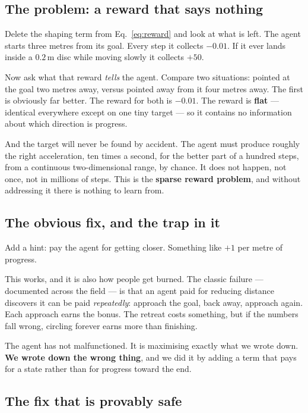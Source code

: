 \documentclass[11pt,a4paper]{article}
\begin{document}
\subsection{The problem: a reward that says nothing}

Delete the shaping term from Eq.~\ref{eq:reward} and look at what is left. The agent starts
three metres from its goal. Every step it collects $-0.01$. If it ever lands inside a
$0.2$\,m disc while moving slowly it collects $+50$.

Now ask what that reward \emph{tells} the agent. Compare two situations: pointed at the goal
two metres away, versus pointed away from it four metres away. The first is obviously far
better. The reward for both is $-0.01$. The reward is \textbf{flat} --- identical everywhere
except on one tiny target --- so it contains no information about which direction is
progress.

And the target will never be found by accident. The agent must produce roughly the right
acceleration, ten times a second, for the better part of a hundred steps, from a continuous
two-dimensional range, by chance. It does not happen, not once, not in millions of steps.
This is the \textbf{sparse reward problem}, and without addressing it there is nothing to
learn from.

\subsection{The obvious fix, and the trap in it}

Add a hint: pay the agent for getting closer. Something like $+1$ per metre of progress.

This works, and it is also how people get burned. The classic failure --- documented across
the field --- is that an agent paid for reducing distance discovers it can be paid
\emph{repeatedly}: approach the goal, back away, approach again. Each approach earns the
bonus. The retreat costs something, but if the numbers fall wrong, circling forever earns
more than finishing.

The agent has not malfunctioned. It is maximising exactly what we wrote down. \textbf{We
wrote down the wrong thing}, and we did it by adding a term that pays for a state rather than
for progress toward the end.

\subsection{The fix that is provably safe}
\end{document}
